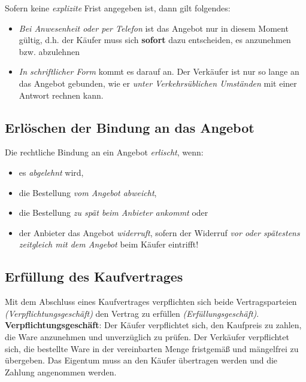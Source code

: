 \documentclass[a4paper, 12pt]{report}
\begin{document}
Sofern keine \emph{explizite} Frist angegeben ist, dann gilt folgendes:

\begin{itemize}
    \item \emph{Bei Anwesenheit oder per Telefon} ist das Angebot nur in diesem
	Moment gültig, d.h. der Käufer muss sich \textbf{sofort} dazu
	entscheiden, es anzunehmen bzw. abzulehnen
    \item \emph{In schriftlicher Form} kommt es darauf an. Der Verkäufer ist nur
	so lange an das Angebot gebunden, wie er \emph{unter Verkehrsüblichen
	Umständen} mit einer Antwort rechnen kann.
\end{itemize}

\subsection{Erlöschen der Bindung an das Angebot}

Die rechtliche Bindung an ein Angebot \emph{erlischt}, wenn:

\begin{itemize}
    \item es \emph{abgelehnt} wird,
    \item die Bestellung \emph{vom Angebot abweicht},
    \item die Bestellung \emph{zu spät beim Anbieter ankommt} oder
    \item der Anbieter das Angebot \emph{widerruft}, sofern der Widerruf \emph{
	vor oder spätestens zeitgleich mit dem Angebot} beim Käufer
	eintrifft!
\end{itemize}

\subsection{Erfüllung des Kaufvertrages}

Mit dem Abschluss eines Kaufvertrages verpflichten sich beide Vertragsparteien
\emph{(Verpflichtungsgeschäft)} den Vertrag zu erfüllen
\emph{(Erfüllungsgeschäft)}. \\

\textbf{Verpflichtungsgeschäft}: Der Käufer verpflichtet sich, den Kaufpreis zu
zahlen, die Ware anzunehmen und unverzüglich zu prüfen. Der Verkäufer
verpflichtet sich, die bestellte Ware in der vereinbarten Menge fristgemäß und
mängelfrei zu übergeben. Das Eigentum muss an den Käufer übertragen werden und
die Zahlung angenommen werden. \\
\end{document}
